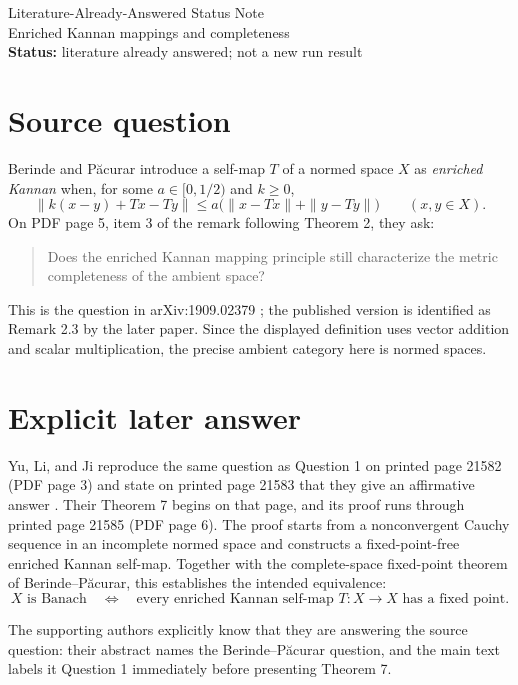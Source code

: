 \documentclass[11pt]{article}
\begin{document}
\begin{center}
{\Large Literature-Already-Answered Status Note}\\[0.3em]
{\large Enriched Kannan mappings and completeness}\\[0.4em]
\textbf{Status:} literature already answered; not a new run result
\end{center}

\section*{Source question}

Berinde and P\u acurar introduce a self-map $T$ of a normed space $X$ as
\emph{enriched Kannan} when, for some $a\in[0,1/2)$ and $k\geq0$,
\[
 \|k(x-y)+Tx-Ty\|
 \leq a\bigl(\|x-Tx\|+\|y-Ty\|\bigr)
 \qquad(x,y\in X).
\]
On PDF page 5, item 3 of the remark following Theorem 2, they ask:

\begin{quote}
Does the enriched Kannan mapping principle still characterize the metric
completeness of the ambient space?
\end{quote}

This is the question in arXiv:1909.02379 \cite{BerindePacurar}; the published
version is identified as Remark 2.3 by the later paper. Since the displayed
definition uses vector addition and scalar multiplication, the precise
ambient category here is normed spaces.

\section*{Explicit later answer}

Yu, Li, and Ji reproduce the same question as Question 1 on printed page
21582 (PDF page 3) and state on printed page 21583 that they give an
affirmative answer \cite{YuLiJi}. Their Theorem 7 begins on that page, and its
proof runs through printed page 21585 (PDF page 6). The proof starts from a
nonconvergent Cauchy sequence in an incomplete normed space and constructs a
fixed-point-free enriched Kannan self-map. Together with the complete-space
fixed-point theorem of Berinde--P\u acurar, this establishes the intended
equivalence:
\[
 X\text{ is Banach}
 \quad\Longleftrightarrow\quad
 \text{every enriched Kannan self-map }T:X\to X\text{ has a fixed point}.
\]

The supporting authors explicitly know that they are answering the source
question: their abstract names the Berinde--P\u acurar question, and the main
text labels it Question 1 immediately before presenting Theorem 7.
\end{document}
